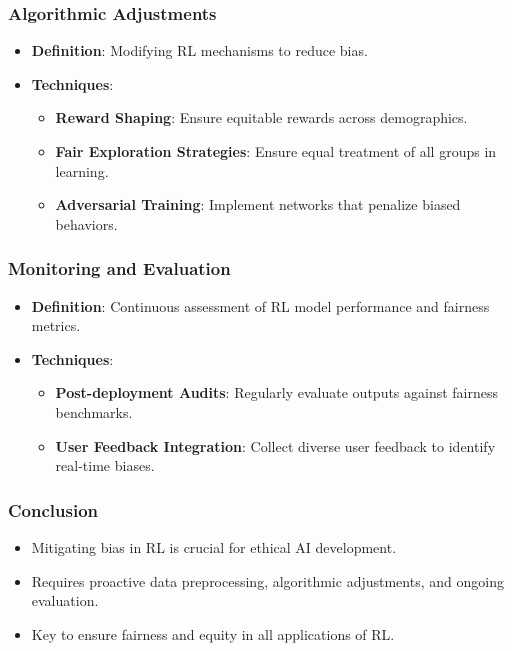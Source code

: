 \documentclass[aspectratio=169]{beamer}
\begin{document}
\begin{frame}[fragile]
    \frametitle{Algorithmic Adjustments}
    \begin{itemize}
        \item \textbf{Definition}: Modifying RL mechanisms to reduce bias.
        \item \textbf{Techniques}:
        \begin{itemize}
            \item \textbf{Reward Shaping}: Ensure equitable rewards across demographics.
            \item \textbf{Fair Exploration Strategies}: Ensure equal treatment of all groups in learning.
            \item \textbf{Adversarial Training}: Implement networks that penalize biased behaviors.
        \end{itemize}
    \end{itemize}
\end{frame}

\begin{frame}[fragile]
    \frametitle{Monitoring and Evaluation}
    \begin{itemize}
        \item \textbf{Definition}: Continuous assessment of RL model performance and fairness metrics.
        \item \textbf{Techniques}:
        \begin{itemize}
            \item \textbf{Post-deployment Audits}: Regularly evaluate outputs against fairness benchmarks.
            \item \textbf{User Feedback Integration}: Collect diverse user feedback to identify real-time biases.
        \end{itemize}
    \end{itemize}
\end{frame}

\begin{frame}[fragile]
    \frametitle{Conclusion}
    \begin{itemize}
        \item Mitigating bias in RL is crucial for ethical AI development.
        \item Requires proactive data preprocessing, algorithmic adjustments, and ongoing evaluation.
        \item Key to ensure fairness and equity in all applications of RL.
    \end{itemize}
\end{frame}
\end{document}
